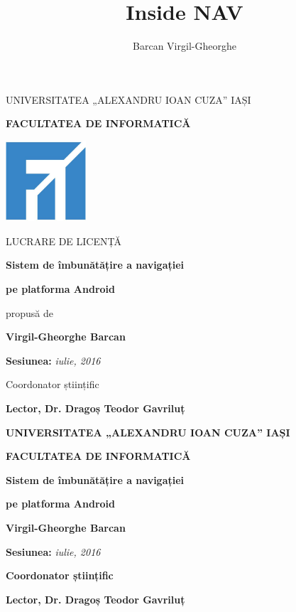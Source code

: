 \documentclass[12pt, a4paper, oneside]{article}
\title{Inside NAV}
\author{Barcan Virgil-Gheorghe}
\begin{document}
\pagestyle{empty}
\centerline{\small{UNIVERSITATEA „ALEXANDRU IOAN CUZA” IAȘI}}
\vspace{0.5cm}
\centerline{\textbf{\Large{\textsf{FACULTATEA DE INFORMATICĂ}}}}
\vspace{2.5cm}
\begin{center}
	\includegraphics[width=3cm,height=3cm]{sigla_FII.png}
\end{center}
\vspace{2.5cm}
\centerline{\Large{LUCRARE DE LICENȚĂ}}
\vspace{1cm}
\centerline{\textbf{\LARGE{Sistem de îmbunătățire a navigației}}}
\vspace{0.2cm}
\centerline{\textbf{\LARGE{pe platforma Android}}}
\vspace{1cm}
\centerline{propusă de}
\vspace{1cm}
\centerline{\textbf{\Large{\textsf{Virgil-Gheorghe Barcan}}}}
\vspace{1.5cm}
\centerline{\textsf{\textbf{Sesiunea:} \textit{iulie, 2016}}}
\vspace{0.5cm}
\centerline{Coordonator științific}
\vspace{0.5cm}
\centerline{\textsf{\textbf{\large{Lector, Dr. Dragoș Teodor Gavriluț}}}}

\clearpage

\pagestyle{empty}
\centerline{\textbf{\large{\textsf{UNIVERSITATEA „ALEXANDRU IOAN CUZA” IAȘI}}}}
\vspace{0.5cm}
\centerline{\textbf{\large{\textsf{FACULTATEA DE INFORMATICĂ}}}}
\vspace{5cm}
\centerline{\textbf{\LARGE{Sistem de îmbunătățire a navigației}}}
\vspace{0.2cm}
\centerline{\textbf{\LARGE{pe platforma Android}}}
\vspace{3cm}
\centerline{\textbf{\Large{\textsf{Virgil-Gheorghe Barcan}}}}
\vspace{2cm}
\centerline{\Large{{\textsf{\textbf{Sesiunea:} \textit{iulie, 2016}}}}}
\vspace{4.5cm}
\centerline{\textbf{Coordonator științific}}
\vspace{0.5cm}
\centerline{\textsf{\textbf{\large{Lector, Dr. Dragoș Teodor Gavriluț}}}}
\end{document}
